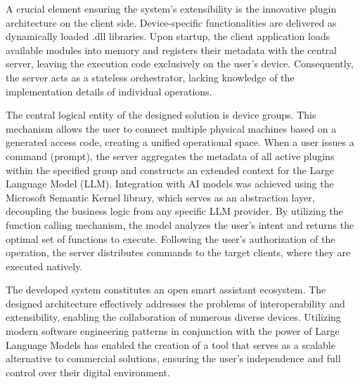 A crucial element ensuring the system's extensibility is the innovative plugin architecture on the client side. Device-specific functionalities are delivered as dynamically loaded .dll libraries. Upon startup, the client application loads available modules into memory and registers their metadata with the central server, leaving the execution code exclusively on the user's device. Consequently, the server acts as a stateless orchestrator, lacking knowledge of the implementation details of individual operations.

The central logical entity of the designed solution is device groups. This mechanism allows the user to connect multiple physical machines based on a generated access code, creating a unified operational space. When a user issues a command (prompt), the server aggregates the metadata of all active plugins within the specified group and constructs an extended context for the Large Language Model (LLM). Integration with AI models was achieved using the Microsoft Semantic Kernel library, which serves as an abstraction layer, decoupling the business logic from any specific LLM provider. By utilizing the function calling mechanism, the model analyzes the user's intent and returns the optimal set of functions to execute. Following the user's authorization of the operation, the server distributes commands to the target clients, where they are executed natively.

The developed system constitutes an open smart assistant ecosystem. The designed architecture effectively addresses the problems of interoperability and extensibility, enabling the collaboration of numerous diverse devices. Utilizing modern software engineering patterns in conjunction with the power of Large Language Models has enabled the creation of a tool that serves as a scalable alternative to commercial solutions, ensuring the user's independence and full control over their digital environment.
